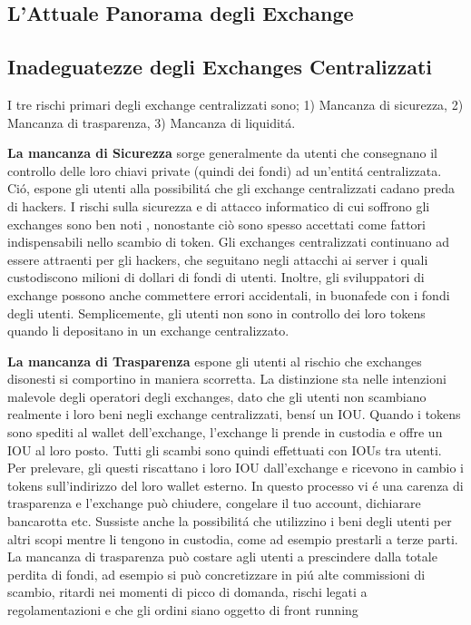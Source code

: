 \documentclass[UTF8,nofonts]{article}
\begin{document}
\begin{multicols}{2}
\section{L'Attuale Panorama degli Exchange\label{sec:current_exchange_landscape}}

\subsection{Inadeguatezze degli Exchanges Centralizzati}
I tre rischi primari degli exchange centralizzati sono;	1) Mancanza di sicurezza, 2) Mancanza di trasparenza, 3) Mancanza di liquidit\'a.

\textbf{La mancanza di Sicurezza} sorge generalmente da utenti che consegnano il controllo delle loro chiavi private (quindi dei fondi) ad un'entit\'a centralizzata. Ci\'o, espone gli utenti alla possibilit\'a che gli exchange centralizzati cadano preda di hackers. I rischi sulla sicurezza e di attacco informatico di cui soffrono gli exchanges sono ben noti\cite{coincheckhack}  \cite{mcmillan2014inside}, nonostante ciò sono spesso accettati come fattori indispensabili nello scambio di token.  Gli exchanges centralizzati continuano ad essere attraenti per gli hackers, che seguitano negli attacchi ai server i quali custodiscono milioni di dollari di fondi di utenti. Inoltre, gli sviluppatori di exchange possono anche commettere errori accidentali, in buonafede con i fondi degli utenti. Semplicemente, gli utenti non sono in controllo dei loro tokens quando li depositano in un exchange centralizzato.

\textbf{La mancanza di Trasparenza} espone gli utenti al rischio che exchanges disonesti si comportino  in maniera scorretta. La distinzione sta nelle intenzioni malevole degli operatori degli exchanges, dato che gli utenti non scambiano realmente i loro beni negli exchange centralizzati, bens\'i un IOU. Quando i tokens sono spediti al wallet dell'exchange, l'exchange li prende in custodia e offre un IOU al loro posto. Tutti gli scambi sono quindi effettuati con IOUs tra utenti. Per prelevare, gli questi riscattano i loro IOU dall'exchange e ricevono in cambio i tokens sull'indirizzo del loro wallet esterno. In questo processo vi \'e una carenza di trasparenza e l'exchange può chiudere, congelare il tuo account, dichiarare bancarotta etc. Sussiste anche la possibilit\'a che utilizzino i beni degli utenti per altri scopi mentre li tengono in custodia, come ad esempio prestarli a terze parti. La mancanza di trasparenza può costare agli utenti a prescindere dalla totale perdita di fondi, ad esempio si può concretizzare in pi\'u alte commissioni di scambio, ritardi nei momenti di picco di domanda, rischi legati a regolamentazioni e che gli ordini siano oggetto di front running


\end{multicols}
\end{document}
